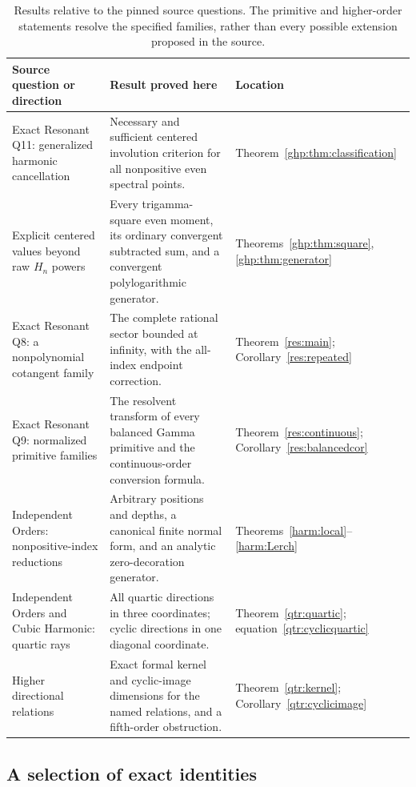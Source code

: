 \begin{table}[htbp]
\centering
\small
\begin{tabularx}{\textwidth}{@{}p{}Y p{0.19\textwidth}@{}}
\toprule
Source question or direction & Result proved here & Location\\
\midrule
Exact Resonant Q11: generalized harmonic cancellation
& Necessary and sufficient centered involution criterion for all
nonpositive even spectral points.
& Theorem~\ref{ghp:thm:classification}\\
\addlinespace
Explicit centered values beyond raw $H_n$ powers
& Every trigamma-square even moment, its ordinary convergent
subtracted sum, and a convergent polylogarithmic generator.
& Theorems~\ref{ghp:thm:square}, \ref{ghp:thm:generator}\\
\addlinespace
Exact Resonant Q8: a nonpolynomial cotangent family
& The complete rational sector bounded at infinity, with the
all-index endpoint correction.
& Theorem~\ref{res:main}; Corollary~\ref{res:repeated}\\
\addlinespace
Exact Resonant Q9: normalized primitive families
& The resolvent transform of every balanced Gamma primitive and
the continuous-order conversion formula.
& Theorem~\ref{res:continuous}; Corollary~\ref{res:balancedcor}\\
\addlinespace
Independent Orders: nonpositive-index reductions
& Arbitrary positions and depths, a canonical finite normal form,
and an analytic zero-decoration generator.
& Theorems~\ref{harm:local}--\ref{harm:Lerch}\\
\addlinespace
Independent Orders and Cubic Harmonic: quartic rays
& All quartic directions in three coordinates; cyclic directions
in one diagonal coordinate.
& Theorem~\ref{qtr:quartic}; equation~\eqref{qtr:cyclicquartic}\\
\addlinespace
Higher directional relations
& Exact formal kernel and cyclic-image dimensions for the named
relations, and a fifth-order obstruction.
& Theorem~\ref{qtr:kernel}; Corollary~\ref{qtr:cyclicimage}\\
\bottomrule
\end{tabularx}
\caption{Results relative to the pinned source questions. The primitive
and higher-order statements resolve the specified families, rather than
every possible extension proposed in the source.}
\label{scope:table}
\end{table}

\subsection{A selection of exact identities}

